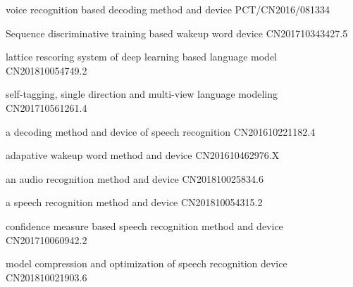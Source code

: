 \begin{patents}{99}
\item  voice recognition based decoding method and device PCT/CN2016/081334
\item  Sequence discriminative training based wakeup word device CN201710343427.5
\item  lattice rescoring system of deep learning based language model CN201810054749.2
\item  self-tagging, single direction and multi-view language modeling CN201710561261.4
\item  a decoding method and device of speech recognition CN201610221182.4
\item  adapative wakeup word method and device CN201610462976.X
\item  an audio recognition method and device CN201810025834.6
\item  a speech recognition method and device CN201810054315.2
\item  confidence measure based speech recognition method and device CN201710060942.2
\item  model compression and optimization of speech recognition device CN201810021903.6

\end{patents}
